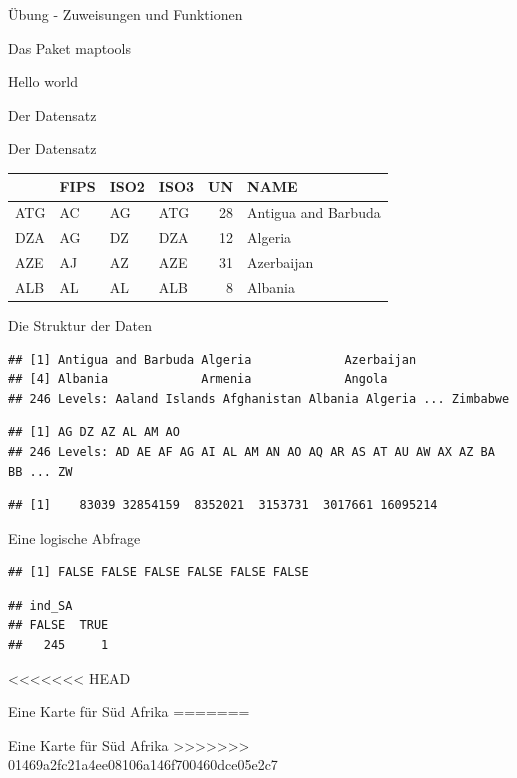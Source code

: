 \documentclass[ignorenonframetext,]{beamer}
\begin{document}
\begin{frame}[fragile]{Übung - Zuweisungen und Funktionen}
\begin{frame}[fragile]{Das Paket maptools}
\begin{frame}[fragile]{Hello world}
\begin{frame}[fragile]{Der Datensatz}
\begin{frame}{Der Datensatz}
\begin{longtable}[]{@{}llllrl@{}}
\toprule
& FIPS & ISO2 & ISO3 & UN & NAME\tabularnewline
\midrule
\endhead
ATG & AC & AG & ATG & 28 & Antigua and Barbuda\tabularnewline
DZA & AG & DZ & DZA & 12 & Algeria\tabularnewline
AZE & AJ & AZ & AZE & 31 & Azerbaijan\tabularnewline
ALB & AL & AL & ALB & 8 & Albania\tabularnewline
\bottomrule
\end{longtable}

\end{frame}

\begin{frame}[fragile]{Die Struktur der Daten}
\protect\hypertarget{die-struktur-der-daten}{}

\begin{verbatim}
## [1] Antigua and Barbuda Algeria             Azerbaijan         
## [4] Albania             Armenia             Angola             
## 246 Levels: Aaland Islands Afghanistan Albania Algeria ... Zimbabwe
\end{verbatim}

\begin{verbatim}
## [1] AG DZ AZ AL AM AO
## 246 Levels: AD AE AF AG AI AL AM AN AO AQ AR AS AT AU AW AX AZ BA BB ... ZW
\end{verbatim}

\begin{verbatim}
## [1]    83039 32854159  8352021  3153731  3017661 16095214
\end{verbatim}

\end{frame}

\begin{frame}[fragile]{Eine logische Abfrage}
\protect\hypertarget{eine-logische-abfrage}{}

\begin{verbatim}
## [1] FALSE FALSE FALSE FALSE FALSE FALSE
\end{verbatim}

\begin{verbatim}
## ind_SA
## FALSE  TRUE 
##   245     1
\end{verbatim}

\end{frame}

<<<<<<< HEAD
\begin{frame}[fragile]{Eine Karte für Süd Afrika}
\protect\hypertarget{eine-karte-fur-sud-afrika}{}
=======
\begin{frame}{Eine Karte für Süd Afrika}
>>>>>>> 01469a2fc21a4ee08106a146f700460dce05e2c7


\end{frame}
\end{frame}
\end{frame}
\end{frame}
\end{frame}
\end{frame}
\end{document}
